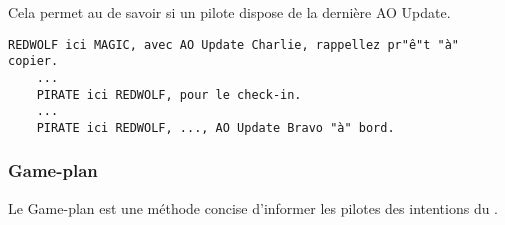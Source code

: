\begin{e1}
\begin{e2}
{			Cela permet au \ja{} de savoir si un pilote dispose de la dernière AO Update.
		}
		
		\begin{minipage}{\linewidth}
			\begin{lstlisting}[caption=AO Update: code, label=aoupdatecode]
	REDWOLF ici MAGIC, avec AO Update Charlie, rappellez pr"ê"t "à" copier.
	...
	PIRATE ici REDWOLF, pour le check-in.
	...
	PIRATE ici REDWOLF, ..., AO Update Bravo "à" bord.
			\end{lstlisting}
		\end{minipage}
		
	\end{e2}
	
\end{e1}
	


\subsubsection{Game-plan}%

Le Game-plan est une méthode concise d'informer les pilotes des intentions du \ja{}.


